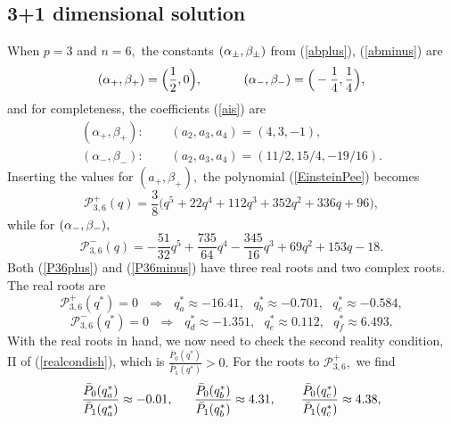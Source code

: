 \documentclass[amsmath,amssymb,11pt]{article}
\begin{document}
\subsection*{3+1 dimensional solution}


When $p=3$ and $n=6,$ the constants $(\alpha_{\pm},\beta_{\pm})$ from (\ref{abplus}), (\ref{abminus}) are
\begin{equation}
(\a_+, \beta_+) = \Big(\frac{1}{2},0\Big), \ \ \ \ \ \ \ \ \ \ (\a_-,\beta_-)=\Big(-\frac{1}{4},\frac{1}{4}\Big),
\end{equation}
and for completeness, the coefficients (\ref{ais}) are  
\begin{equation}\label{p3ais}
\begin{split}
(\alpha_+,\beta_+): \ \ \ & \ \ \ (a_2,a_3,a_4) = (4,3,-1), \\
(\alpha_-,\beta_-): \ \ \ & \ \ \ (a_2,a_3,a_4)=(11/2, 15/4, -19/16).
\end{split}
\end{equation}
Inserting the values for $(a_+,\beta_+),$ the polynomial (\ref{EinsteinPee}) becomes
\begin{equation}\label{P36plus}
\mathcal{P}^{+}_{3,6}(q) = \frac{3}{8}\Big(q^5+22q^4+112 q^3+352 q^2+336 q+96\Big),
\end{equation}
while for $(\alpha_-,\beta_-),$ 
\begin{equation}\label{P36minus}
\mathcal{P}^{-}_{3,6}(q) = -\frac{51}{32}q^5+\frac{735}{64}q^4-\frac{345}{16}q^3+69q^2+153q-18.
\end{equation}
Both (\ref{P36plus}) and (\ref{P36minus}) have three real roots and two complex roots. The real roots are 
\begin{equation}
\mathcal{P}^{+}_{3,6}(q^*)=0 \ \ \ \Rightarrow \ \ \ q_a^* \approx -16.41, \ \ \ q_b^*\approx -0.701, \ \ \ q_c^*\approx -0.584,
\end{equation}
\begin{equation}
\mathcal{P}^{-}_{3,6}(q^*) = 0 \ \ \ \Rightarrow \ \ \ q_d^* \approx-1.351, \ \ \ q_e^*\approx0.112, \ \ \ q_f^*\approx 6.493.
\end{equation}
With the real roots in hand, we now need to check the second reality condition, II of (\ref{realcondish}), which is $\frac{\bar{P}_0(q^*)}{\bar{P}_1(q^*)}>0.$ For the roots to $\mathcal{P}^{+}_{3,6},$ we find
\begin{equation}
\frac{\bP_0(q_a^*)}{\bP_1(q_a^*)}\approx -0.01, \ \ \ \ \ \frac{\bP_0(q_b^*)}{\bP_1(q_b^*)} \approx 4.31, \ \ \ \ \ \ \frac{\bP_0(q_c^*)}{\bP_1(q_c^*)}\approx 4.38,
\end{equation}
\end{document}
